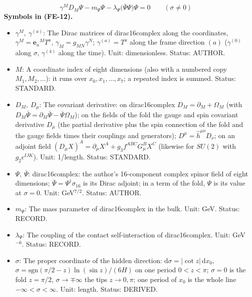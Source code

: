 \documentclass[
  10pt,
]{article}
\providecommand{\tightlist}{%
  \setlength{\itemsep}{0pt}\setlength{\parskip}{0pt}}
\begin{document}
\[
\gamma^MD_M\Psi - m_\Psi\Psi - \lambda_\Psi\big(\bar\Psi\Psi\big)\Psi = 0\qquad (\sigma \ne 0) \tag{FE-12}
\] \textbf{Symbols in (FE-12).}

\begin{itemize}
\tightlist
\item
  \(\gamma^M,\ \gamma^{(a)}\): The Dirac matrices of dirac16complex
  along the coordinates, \(\gamma^M = \mathbf{e}_a{}^MT^a\),
  \(\gamma_M = g_{MN}\gamma^N\); \(\gamma^{(a)} = T^a\) along the frame
  direction \((a)\) (\(\gamma^{(0)}\) along \(\sigma\), \(\gamma^{(4)}\)
  along the time). Unit: dimensionless. Status: AUTHOR.
\item
  \(M\): A coordinate index of eight dimensions (also with a numbered
  copy \(M_1, M_2, \dots\)): it runs over \(x_0, x_1, \dots, x_7\); a
  repeated index is summed. Status: STANDARD.
\item
  \(D_M,\ D_\mu\): The covariant derivative: on dirac16complex
  \(D_M = \partial_M + \Omega_M\) (with
  \(D_M\bar\Psi = \partial_M\bar\Psi - \bar\Psi\Omega_M\)); on the
  fields of the fold the gauge and spin covariant derivative \(D_\mu\)
  (the partial derivative plus the spin connection of the fold and the
  gauge fields times their couplings and generators);
  \(D^\mu = \hat h^{\mu\nu}D_\nu\); on an adjoint field
  \((D_\mu X)^A = \partial_\mu X^A + g_3f^{ABC}G^B_\mu X^C\) (likewise
  for \(SU(2)\) with \(g_2\epsilon^{IJK}\)). Unit: 1/length. Status:
  STANDARD.
\item
  \(\Psi,\ \bar\Psi\): dirac16complex: the author's 16-component complex
  spinor field of eight dimensions;
  \(\bar\Psi = \Psi^\dagger\sigma_{16}\) is its Dirac adjoint; in a term
  of the fold, \(\Psi\) is its value at \(\sigma = 0\). Unit:
  GeV\(^{7/2}\). Status: AUTHOR.
\item
  \(m_\Psi\): The mass parameter of dirac16complex in the bulk. Unit:
  GeV. Status: RECORD.
\item
  \(\lambda_\Psi\): The coupling of the contact self-interaction of
  dirac16complex. Unit: GeV\(^{-6}\). Status: RECORD.
\item
  \(\sigma\): The proper coordinate of the hidden direction:
  \(\mathrm{d}\sigma = \lvert\cot z\rvert\,\mathrm{d}x_0\),
  \(\sigma = \mathrm{sgn}(\pi/2 - z)\ln(\sin z)/(6H)\) on one period
  \(0 < z < \pi\); \(\sigma = 0\) is the fold \(z = \pi/2\),
  \(\sigma \to \mp\infty\) the tips \(z \to 0, \pi\); one period of
  \(x_0\) is the whole line \(-\infty < \sigma < \infty\). Unit: length.
  Status: DERIVED.
\end{itemize}
\end{document}
